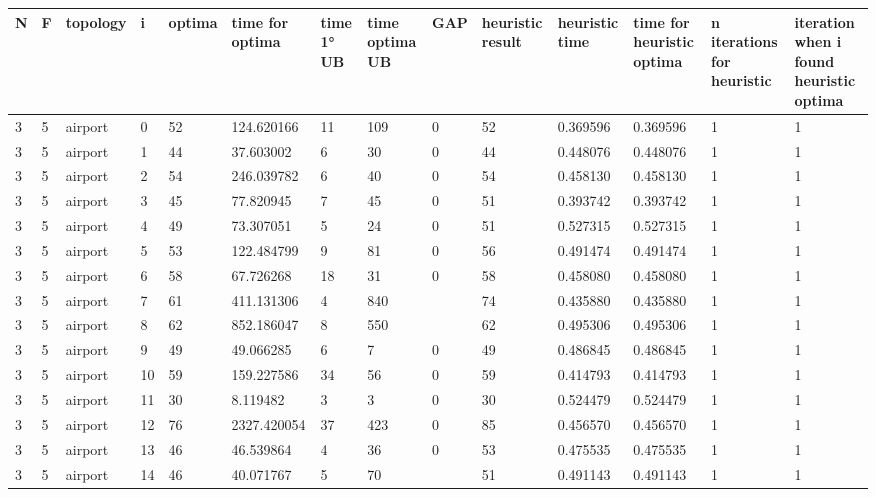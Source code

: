 \documentclass[../thesis.tex]{subfiles}
\begin{document}
\begin{table}[!ht]
    \centering
    \begin{tabularx}{\textwidth}{|X|X|X|X|X|X|X|X|X|X|X|X|X|X|}
    \hline
        N & F & topology & i & optima & time for optima & time 1° UB & time optima UB & GAP & heuristic result & heuristic time & time for heuristic optima & n iterations for heuristic & iteration when i found heuristic optima \\ \hline
        3 & 5 & airport & 0 & 52 & 124.620166 & 11 & 109 & 0 & 52 & 0.369596 & 0.369596 & 1 & 1 \\ \hline
        3 & 5 & airport & 1 & 44 & 37.603002 & 6 & 30 & 0 & 44 & 0.448076 & 0.448076 & 1 & 1 \\ \hline
        3 & 5 & airport & 2 & 54 & 246.039782 & 6 & 40 & 0 & 54 & 0.458130 & 0.458130 & 1 & 1 \\ \hline
        3 & 5 & airport & 3 & 45 & 77.820945 & 7 & 45 & 0 & 51 & 0.393742 & 0.393742 & 1 & 1 \\ \hline
        3 & 5 & airport & 4 & 49 & 73.307051 & 5 & 24 & 0 & 51 & 0.527315 & 0.527315 & 1 & 1 \\ \hline
        3 & 5 & airport & 5 & 53 & 122.484799 & 9 & 81 & 0 & 56 & 0.491474 & 0.491474 & 1 & 1 \\ \hline
        3 & 5 & airport & 6 & 58 & 67.726268 & 18 & 31 & 0 & 58 & 0.458080 & 0.458080 & 1 & 1 \\ \hline
        3 & 5 & airport & 7 & 61 & 411.131306 & 4 & 840 & ~ & 74 & 0.435880 & 0.435880 & 1 & 1 \\ \hline
        3 & 5 & airport & 8 & 62 & 852.186047 & 8 & 550 & ~ & 62 & 0.495306 & 0.495306 & 1 & 1 \\ \hline
        3 & 5 & airport & 9 & 49 & 49.066285 & 6 & 7 & 0 & 49 & 0.486845 & 0.486845 & 1 & 1 \\ \hline
        3 & 5 & airport & 10 & 59 & 159.227586 & 34 & 56 & 0 & 59 & 0.414793 & 0.414793 & 1 & 1 \\ \hline
        3 & 5 & airport & 11 & 30 & 8.119482 & 3 & 3 & 0 & 30 & 0.524479 & 0.524479 & 1 & 1 \\ \hline
        3 & 5 & airport & 12 & 76 & 2327.420054 & 37 & 423 & 0 & 85 & 0.456570 & 0.456570 & 1 & 1 \\ \hline
        3 & 5 & airport & 13 & 46 & 46.539864 & 4 & 36 & 0 & 53 & 0.475535 & 0.475535 & 1 & 1 \\ \hline
        3 & 5 & airport & 14 & 46 & 40.071767 & 5 & 70 & ~ & 51 & 0.491143 & 0.491143 & 1 & 1 \\ \hline

\end{tabularx}
\end{table}
\end{document}

